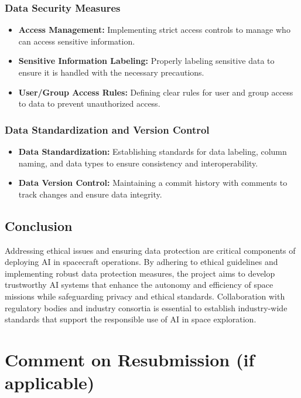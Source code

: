 \documentclass[a4paper, 11pt]{article}
\begin{document}
\subsubsection{Data Security Measures}

\begin{itemize}
    \item \textbf{Access Management:} Implementing strict access controls to manage who can access sensitive information.
    \item \textbf{Sensitive Information Labeling:} Properly labeling sensitive data to ensure it is handled with the necessary precautions.
    \item \textbf{User/Group Access Rules:} Defining clear rules for user and group access to data to prevent unauthorized access.
\end{itemize}

\subsubsection{Data Standardization and Version Control}

\begin{itemize}
    \item \textbf{Data Standardization:} Establishing standards for data labeling, column naming, and data types to ensure consistency and interoperability.
    \item \textbf{Data Version Control:} Maintaining a commit history with comments to track changes and ensure data integrity.
\end{itemize}

\subsection{Conclusion}

Addressing ethical issues and ensuring data protection are critical components of deploying AI in spacecraft operations. By adhering to ethical guidelines and implementing robust data protection measures, the project aims to develop trustworthy AI systems that enhance the autonomy and efficiency of space missions while safeguarding privacy and ethical standards. Collaboration with regulatory bodies and industry consortia is essential to establish industry-wide standards that support the responsible use of AI in space exploration.
\section{Comment on Resubmission (if applicable)}
\end{document}
